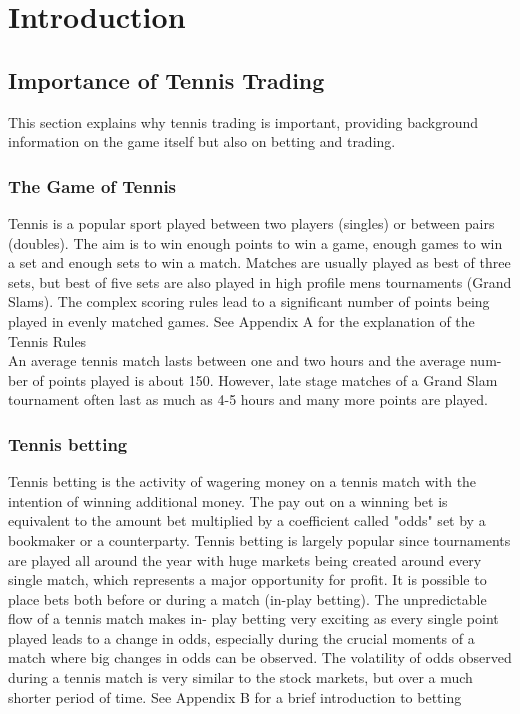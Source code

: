 \documentclass[10pt]{report}
\begin{document}
\tableofcontents

\chapter{Introduction}

\section{Importance of Tennis Trading}

This section explains why tennis trading is important, providing background information on the game itself but also on betting and trading.

\subsection{The Game of Tennis }

Tennis is a popular sport played between two players (singles) or between pairs
(doubles). The aim is to win enough points to win a game, enough games to win
a set and enough sets to win a match. Matches are usually played as best of three
sets, but best of five sets are also played in high profile mens tournaments (Grand
Slams). The complex scoring rules lead to a significant number of points being
played in evenly matched games. See Appendix A for the explanation of the Tennis Rules\\
An average tennis match lasts between one and two hours and the average num-
ber of points played is about 150. However, late stage matches of a Grand Slam
tournament often last as much as 4-5 hours and many more points are played.


\subsection{Tennis betting}

Tennis betting is the activity of wagering money on a tennis match with the intention of winning additional money.
The pay out on a winning bet is equivalent to the amount bet multiplied by a coefficient called "odds" set by a bookmaker or a 
counterparty.
Tennis betting is largely popular since tournaments are played all around the year
with huge markets being created around every single match, which represents a
major opportunity for profit. It is possible to place bets both before or during
a match (in-play betting). The unpredictable flow of a tennis match makes in-
play betting very exciting as every single point played leads to a change in odds,
especially during the crucial moments of a match where big changes in odds can be
observed. The volatility of odds observed during a tennis match is very similar to
the stock markets, but over a much shorter period of time.
See Appendix B for a brief introduction to betting\\
\end{document}
